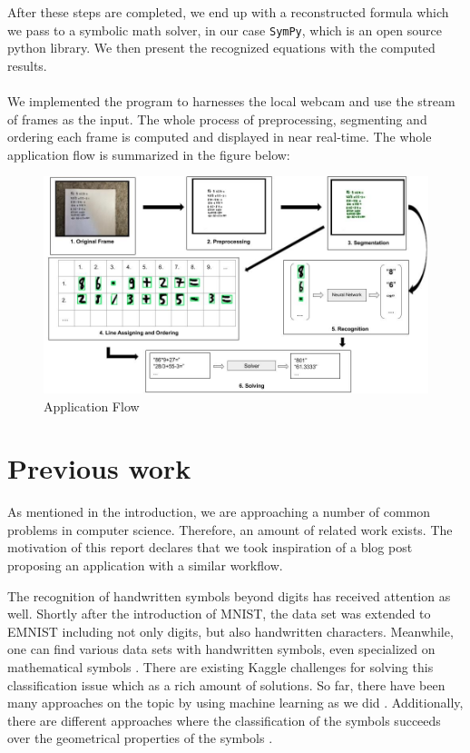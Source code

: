 \documentclass[12pt]{article}
\begin{document}
	After these steps are completed, we end up with a reconstructed formula which we pass to a symbolic math solver, in our case \texttt{SymPy}, which is an open source python library. We then present the recognized equations with the computed results.\\\\
	We implemented the program to harnesses the local webcam and use the stream of frames as the input. The whole process of preprocessing, segmenting and ordering each frame is computed and displayed in near real-time.
	The whole application flow is summarized in the figure below:
	\begin{figure}[h]
		\includegraphics[width=1\textwidth]{ImagesForReport/fulldiagram.jpg}
		\caption{Application Flow}
		\label{fig:FullFlow}
	\end{figure}

	\pagebreak\section{Previous work}
	As mentioned in the introduction, we are approaching a number of common problems in computer science. Therefore, an amount of related work exists. The motivation of this report declares that we took inspiration of a blog post \cite{inspired-blog} proposing an application with a similar workflow. 
	
	The recognition of handwritten symbols beyond digits has received attention as well. Shortly after the introduction of MNIST, the data set was extended to EMNIST \cite{emnist} including not only digits, but also handwritten characters. Meanwhile, one can find various data sets with handwritten symbols, even specialized on mathematical symbols \cite{chajri2016}. There are existing Kaggle challenges for solving this classification issue \cite{kaggle} which as a rich amount of solutions. So far, there have been many approaches on the topic by using machine learning as we did \cite{ramadhan2016} \cite{lee2016}. Additionally, there are different approaches where the classification of the symbols succeeds over the geometrical properties of the symbols \cite{golubitsky2010}. 
	
\end{document}
